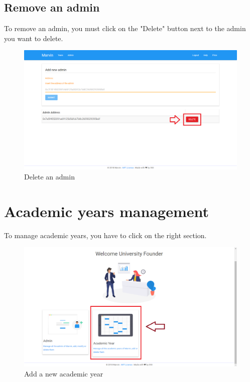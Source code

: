 \documentclass[ManualeUtente]{subfiles}
\begin{document}
\subsection{Remove an admin}
To remove an admin, you must click on the "Delete" button next to the admin you want to delete.
\begin{figure}[H]
	\centering
	\includegraphics[width=0.7\linewidth]{image/DeleteAdmin}
	\caption[Delete admin]{Delete an admin}
	\label{fig:Delete an admin}
\end{figure}
\newpage

\section{Academic years management}
To manage academic years, you have to click on the right section.
\begin{figure}[H]
	\centering
	\includegraphics[width=0.7\linewidth]{image/UniAcademicYear}
	\caption[Add year]{Add a new academic year}
	\label{fig:Add a new academic year}
\end{figure}
\end{document}

